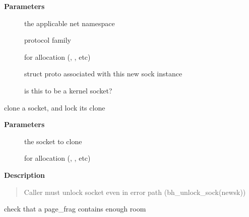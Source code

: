 \documentclass[a4paper,8pt,english]{sphinxmanual}
\begin{document}
\textbf{Parameters}
\begin{description}
\item[{}] \leavevmode
the applicable net namespace

\item[{}] \leavevmode
protocol family

\item[{}] \leavevmode
for allocation (, , etc)

\item[{}] \leavevmode
struct proto associated with this new sock instance

\item[{}] \leavevmode
is this to be a kernel socket?

\end{description}

\begin{fulllineitems}
\label{networking/kapi:c.sk_clone_lock}
clone a socket, and lock its clone

\end{fulllineitems}


\textbf{Parameters}
\begin{description}
\item[{}] \leavevmode
the socket to clone

\item[{}] \leavevmode
for allocation (, , etc)

\end{description}

\textbf{Description}
\begin{quote}

Caller must unlock socket even in error path (bh\_unlock\_sock(newsk))
\end{quote}

\begin{fulllineitems}
\label{networking/kapi:c.skb_page_frag_refill}
check that a page\_frag contains enough room

\end{fulllineitems}
\end{document}
